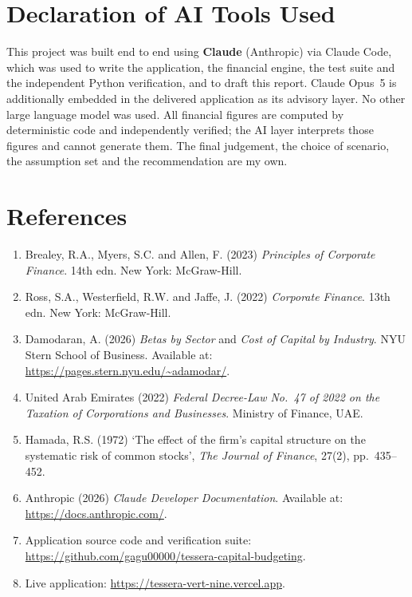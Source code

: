 \documentclass[11pt,a4paper]{article}
\begin{document}
\section*{Declaration of AI Tools Used}

This project was built end to end using \textbf{Claude} (Anthropic) via Claude
Code, which was used to write the application, the financial engine, the test
suite and the independent Python verification, and to draft this report. Claude
Opus~5 is additionally embedded in the delivered application as its advisory
layer. No other large language model was used. All financial figures are computed
by deterministic code and independently verified; the AI layer interprets those
figures and cannot generate them. The final judgement, the choice of scenario, the
assumption set and the recommendation are my own.

\section*{References}

\begin{enumerate}[leftmargin=1.4em,itemsep=0.2em]
  \item Brealey, R.A., Myers, S.C. and Allen, F. (2023) \textit{Principles of
    Corporate Finance}. 14th edn. New York: McGraw-Hill.
  \item Ross, S.A., Westerfield, R.W. and Jaffe, J. (2022) \textit{Corporate
    Finance}. 13th edn. New York: McGraw-Hill.
  \item Damodaran, A. (2026) \textit{Betas by Sector} and \textit{Cost of Capital
    by Industry}. NYU Stern School of Business. Available at:
    \url{https://pages.stern.nyu.edu/~adamodar/}.
  \item United Arab Emirates (2022) \textit{Federal Decree-Law No.\ 47 of 2022 on
    the Taxation of Corporations and Businesses}. Ministry of Finance, UAE.
  \item Hamada, R.S. (1972) `The effect of the firm's capital structure on the
    systematic risk of common stocks', \textit{The Journal of Finance}, 27(2),
    pp.\ 435--452.
  \item Anthropic (2026) \textit{Claude Developer Documentation}. Available at:
    \url{https://docs.anthropic.com/}.
  \item Application source code and verification suite:
    \url{https://github.com/gagu00000/tessera-capital-budgeting}.
  \item Live application: \url{https://tessera-vert-nine.vercel.app}.
\end{enumerate}
\end{document}
